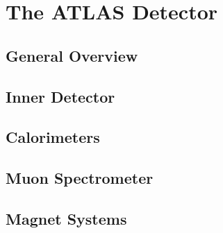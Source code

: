 \chapter{The ATLAS Detector}

\section{General Overview}
\section{Inner Detector}
\section{Calorimeters}
\section{Muon Spectrometer}
\section{Magnet Systems}

